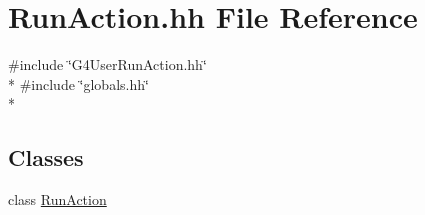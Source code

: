 \hypertarget{_run_action_8hh}{\section{Run\-Action.\-hh File Reference}
\label{_run_action_8hh}
}
{\ttfamily \#include \char`\"{}G4\-User\-Run\-Action.\-hh\char`\"{}}\\*
{\ttfamily \#include \char`\"{}globals.\-hh\char`\"{}}\\*
\subsection*{Classes}
\begin{DoxyCompactItemize}
\item 
class \hyperlink{class_run_action}{Run\-Action}
\end{DoxyCompactItemize}
